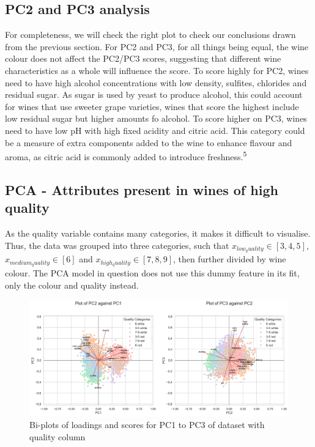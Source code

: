 \documentclass[
]{article}
\begin{document}
\subsection{PC2 and PC3 analysis}\label{pc2-and-pc3-analysis}

For completeness, we will check the right plot to check our conclusions
drawn from the previous section. For PC2 and PC3, for all things being
equal, the wine colour does not affect the PC2/PC3 scores, suggesting
that different wine characteristics as a whole will influence the score.
To score highly for PC2, wines need to have high alcohol concentrations
with low density, sulfites, chlorides and residual sugar. As sugar is
used by yeast to produce alcohol, this could account for wines that use
sweeter grape varieties, wines that score the highest include low
residual sugar but higher amounts fo alcohol. To score higher on PC3,
wines need to have low pH with high fixed acidity and citric acid. This
category could be a measure of extra components added to the wine to
enhance flavour and aroma, as citric acid is commonly added to introduce
freshness.\textsuperscript{5}

\subsection{PCA - Attributes present in wines of high
quality}\label{pca---attributes-present-in-wines-of-high-quality}

As the quality variable contains many categories, it makes it difficult
to visualise. Thus, the data was grouped into three categories, such
that \(x_{low_quality} \in [3, 4, 5]\), \(x_{medium_quality} \in [6]\)
and \(x_{high_quality} \in [7, 8, 9]\), then further divided by wine
colour. The PCA model in question does not use this dummy feature in its
fit, only the colour and quality instead.

\begin{figure}
\centering
\includegraphics{wine_quality_pc2_vs_pc1_with_quality_new.png}
\caption{Bi-plots of loadings and scores for PC1 to PC3 of dataset with
quality column}
\end{figure}
\end{document}
